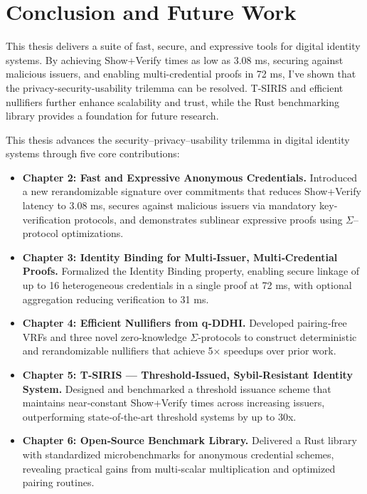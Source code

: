 \chapter{Conclusion and Future Work}\label{chap7}
This thesis delivers a suite of fast, secure, and expressive tools for digital identity systems. By achieving Show+Verify times as low as 3.08 ms, securing against malicious issuers, and enabling multi-credential proofs in 72 ms, I’ve shown that the privacy-security-usability trilemma can be resolved. T-SIRIS and efficient nullifiers further enhance scalability and trust, while the Rust benchmarking library provides a foundation for future research.


This thesis advances the security–privacy–usability trilemma in digital identity systems through five core contributions:

\begin{itemize}
  \item \textbf{Chapter 2: Fast and Expressive Anonymous Credentials.} Introduced a new rerandomizable signature over commitments that reduces Show+Verify latency to 3.08 ms, secures against malicious issuers via mandatory key‐verification protocols, and demonstrates sublinear expressive proofs using $\Sigma$–protocol optimizations.
  
  \item \textbf{Chapter 3: Identity Binding for Multi‐Issuer, Multi‐Credential Proofs.} Formalized the Identity Binding property, enabling secure linkage of up to 16 heterogeneous credentials in a single proof at 72 ms, with optional aggregation reducing verification to 31 ms.
  
  \item \textbf{Chapter 4: Efficient Nullifiers from q‐DDHI.} Developed pairing‐free VRFs and three novel zero‐knowledge $\Sigma$-protocols to construct deterministic and rerandomizable nullifiers that achieve 5× speedups over prior work.
  
  \item \textbf{Chapter 5: T‐SIRIS — Threshold‐Issued, Sybil‐Resistant Identity System.} Designed and benchmarked a threshold issuance scheme that maintains near‐constant Show+Verify times across increasing issuers, outperforming state‐of‐the‐art threshold systems by up to 30x.
  
  \item \textbf{Chapter 6: Open‐Source Benchmark Library.} Delivered a Rust library with standardized microbenchmarks for anonymous credential schemes, revealing practical gains from multi‐scalar multiplication and optimized pairing routines.
\end{itemize}

